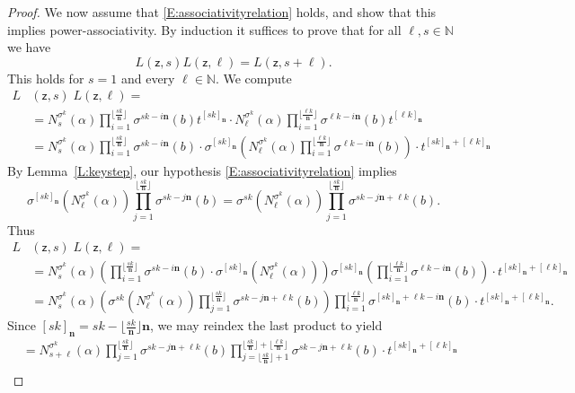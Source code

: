 \documentclass[10pt,a4paper]{amsart}
\newcommand{\de}{\mathbf{n}}  %
\newcommand{\scz}{\mathsf{z}}  %
\begin{document}
\begin{proof}
    We now assume that \eqref{E:associativityrelation} holds, and show that this implies power-associativity.  By induction it suffices to prove that
    for all $\ell,s\in \mathbb{N}$ we have
    $$
    L(\scz,s)L(\scz,\ell) = L(\scz,s+\ell).
    $$
This holds for $s=1$ and every $\ell\in \mathbb{N}$.  We compute
\begin{align*}
L&(\scz,s)\; L(\scz,\ell)=\\
&=N_{s}^{\sigma^k}(\alpha)\prod_{i=1}^{\lfloor \frac{s k}{\de}\rfloor} \sigma^{s k-i\de}(b)t^{[s k]_{\de}}\cdot N_{\ell}^{\sigma^k}(\alpha)\prod_{i=1}^{\lfloor \frac{\ell k}{\de}\rfloor} \sigma^{\ell k-i\de}(b)t^{[\ell k]_{\de}}\\
&= N_{s}^{\sigma^k}(\alpha)\prod_{i=1}^{\lfloor \frac{s k}{\de}\rfloor} \sigma^{s k-i\de}(b)\cdot
\sigma^{[s k]_{\de}}\left(N_{\ell}^{\sigma^k}(\alpha)\prod_{i=1}^{\lfloor \frac{\ell k}{\de}\rfloor} \sigma^{\ell k-i\de}(b)\right) \cdot t^{[s k]_{\de} + [\ell k]_{\de}}
\end{align*}
By Lemma~\ref{L:keystep}, our hypothesis \eqref{E:associativityrelation} implies
$$
\sigma^{[sk]_\de}(N_{\ell}^{\sigma^k}(\alpha))\prod_{j=1}^{\lfloor \frac{s k}{\de}\rfloor}\sigma^{sk-j\de}(b) = \sigma^{sk}(N_{\ell}^{\sigma^k}(\alpha))\prod_{j=1}^{\lfloor \frac{s k}{\de}\rfloor}\sigma^{sk-j\de+\ell k}(b).
$$
Thus
\begin{align*}
  L&(\scz,s)\; L(\scz,\ell)=\\
  &= N_{s}^{\sigma^k}(\alpha) \left(\prod_{i=1}^{\lfloor \frac{s k}{\de}\rfloor} \sigma^{s k-i\de}(b)\cdot
\sigma^{[s k]_{\de}}(N_{\ell}^{\sigma^k}(\alpha)) \right) \sigma^{[sk]_{\de}}\left(\prod_{i=1}^{\lfloor \frac{\ell k}{\de}\rfloor} \sigma^{\ell k-i\de}(b)\right) \cdot t^{[s k]_{\de} + [\ell k]_{\de}}\\
&= N_{s}^{\sigma^k}(\alpha)
\left( \sigma^{sk}(N_{\ell}^{\sigma^k}(\alpha))\prod_{j=1}^{\lfloor \frac{s k}{\de}\rfloor}\sigma^{sk-j\de+\ell k}(b)
\right)
\prod_{i=1}^{\lfloor \frac{\ell k}{\de}\rfloor} \sigma^{[sk]_\de+\ell k-i\de}(b) \cdot t^{[s k]_{\de} + [\ell k]_{\de}}.
\end{align*}
Since $[sk]_{\de}=sk-\lfloor \frac{sk}{\de}\rfloor \de$, we may reindex the last product to yield
\begin{align*}
&= N_{s+\ell}^{\sigma^k}(\alpha)
\prod_{j=1}^{\lfloor \frac{s k}{\de}\rfloor}\sigma^{sk-j\de +\ell k}(b)
\prod_{j=\lfloor \frac{s k}{\de}\rfloor+1}^{\lfloor \frac{s k}{\de}\rfloor+\lfloor \frac{\ell k}{\de}\rfloor}\sigma^{sk-j\de+\ell k}(b)  \cdot t^{[s k]_{\de} + [\ell k]_{\de}}\\

\end{align*}
\end{proof}
\end{document}
